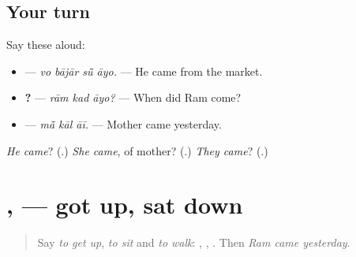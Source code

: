 \subsection*{Your turn}
Say these aloud:

\begin{itemize}
\raggedright
  \item \textbf{   } — \emph{vo bājār sū̃ āyo.} — He came from the market.
  \item \textbf{  ?} — \emph{rām kad āyo?} — When did Ram come?
  \item \textbf{  } — \emph{mā̃ kāl āī.} — Mother came yesterday.
\end{itemize}

\begin{tcolorbox}[breakable,colback=teal!4,colframe=teal!35!black,title={Before you move on}]
\emph{He came}? (\textbf{}.) \emph{She came}, of mother? (\textbf{}.) \emph{They came}? (\textbf{}.)
\end{tcolorbox}
\section[\texorpdfstring{\mw{उठ्यो} · \mw{बैठ्यो} (uṭhyo · baiṭhyo)}{उठ्यो · बैठ्यो (uṭhyo · baiṭhyo)}]{,  — got up, sat down}

\label{lesson:MW-C160-uthyo}



\begin{quote}
Say \emph{to get up}, \emph{to sit} and \emph{to walk}: \textbf{}, \textbf{}, \textbf{}. Then \emph{Ram came yesterday}.
\end{quote}

